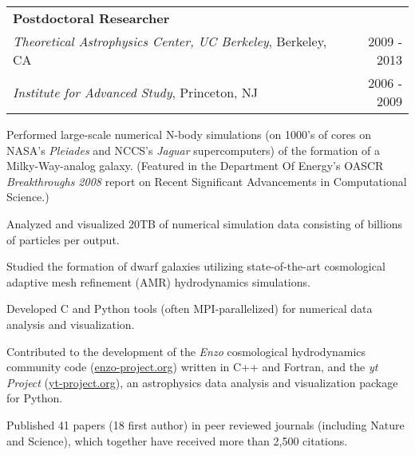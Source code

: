 \begin{resume}
\vspace*{-0.05in}
\hspace*{-0.1in}
\begin{tabularx}{1.025\textwidth}{Xr}
\textbf{Postdoctoral Researcher} & \\
\hspace{0.25in} \textit{Theoretical Astrophysics Center, UC Berkeley}, Berkeley, CA & 2009 - 2013 \\
\hspace{0.25in} \textit{Institute for Advanced Study}, Princeton, NJ & 2006 - 2009 \\
\end{tabularx}
\begin{list1}
\item Performed large-scale numerical N-body simulations (on 1000's of cores on NASA's \textit{Pleiades} and NCCS's \textit{Jaguar} supercomputers) of the formation of a Milky-Way-analog galaxy. (Featured in the Department Of Energy's OASCR \textit{Breakthroughs 2008} report on Recent Significant Advancements in Computational Science.)
\item Analyzed and visualized 20TB of numerical simulation data consisting of billions of particles per output.
\item Studied the formation of dwarf galaxies utilizing state-of-the-art cosmological adaptive mesh refinement (AMR) hydrodynamics simulations.
\item Developed C and Python tools (often MPI-parallelized) for numerical data analysis and visualization.
\item Contributed to the development of the \textit{Enzo} cosmological hydrodynamics community code (\url{enzo-project.org}) written in C++ and Fortran, and the \textit{yt Project} (\url{yt-project.org}), an astrophysics data analysis and visualization package for Python.
\item Published 41 papers (18 first author) in peer reviewed journals (including Nature and Science), which together have received more than 2,500 citations.
\end{list1}


\end{resume}
